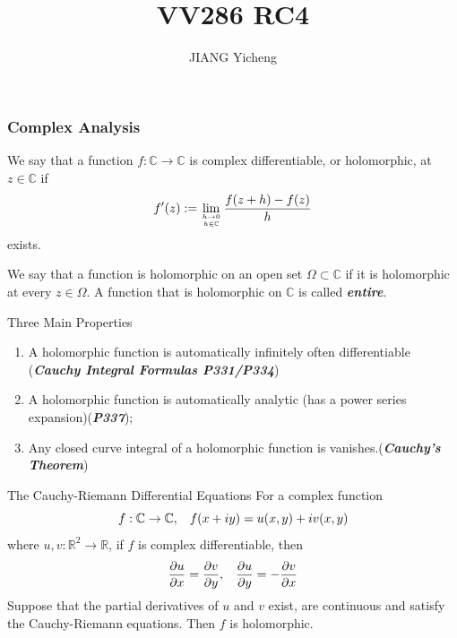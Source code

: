 \documentclass{beamer}
\title{\textcolor[rgb]{0,0.168,0.376}{VV286 RC4}}
\author{JIANG Yicheng}
\begin{document}
\begin{frame}
\titlepage
\end{frame}


\begin{frame}
\frametitle{Complex Analysis}
We say that a function $f : \mathbb{C}\rightarrow\mathbb{C}$ is complex
differentiable, or holomorphic, at $z \in\mathbb{C}$ if
$$f'(z):=\lim_{h\rightarrow0\atop h\in\mathbb{C}}\dfrac{f(z+h)-f(z)}{h}$$
exists.
\begin{block}{}
We say that a function is holomorphic on an open set $\Omega\subset \mathbb{C}$ if it is holomorphic at every $z \in \Omega$. A function that is holomorphic on $\mathbb{C}$ is called \textcolor[rgb]{0,0.6,0.3}{\textit{\textbf{entire}}}.
\end{block}

\end{frame}

\begin{frame}
\begin{block}{Three Main Properties}
\begin{enumerate}
\item A holomorphic function is automatically infinitely often differentiable (\textcolor[rgb]{0,0.6,0.3}{\textbf{\textit{Cauchy Integral Formulas P331/P334}}})
\item A holomorphic function is automatically analytic (has a power series expansion)(\textcolor[rgb]{0,0.6,0.3}{\textbf{\textit{P337}}});
\item Any closed curve integral of a holomorphic function is vanishes.(\textcolor[rgb]{0,0.6,0.3}{\textbf{\textit{Cauchy's Theorem}}})
\end{enumerate}
\end{block}

\end{frame}

\begin{frame}
\begin{block}{The Cauchy-Riemann Differential Equations}
For a complex function
$$f:\mathbb{C}\rightarrow\mathbb{C},\hspace{3mm}f(x+iy)=u(x,y)+iv(x,y)$$
where $u,v:\mathbb{R}^2\rightarrow\mathbb{R}$, if $f$ is complex differentiable, then
$$\dfrac{\partial u}{\partial x}=\dfrac{\partial v}{\partial y},\hspace{3mm}\dfrac{\partial u}{\partial y}=-\dfrac{\partial v}{\partial x}$$
Suppose that the partial derivatives of $u$ and $v$ exist, are continuous and satisfy the Cauchy-Riemann equations. Then $f$ is holomorphic.
\end{block}

\end{frame}
\end{document}
